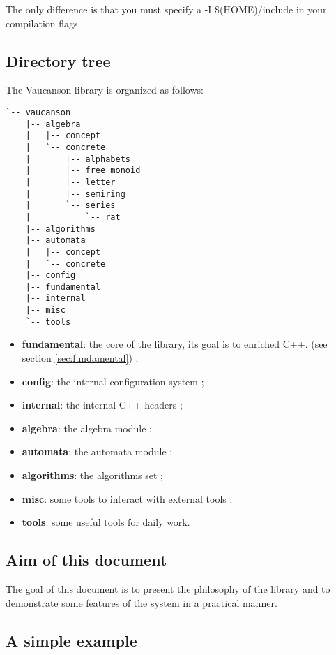 \documentclass{article}
\begin{document}
The only difference is that you must specify a -I \$(HOME)/include in
your compilation flags.

\subsection{Directory tree}

The Vaucanson library is organized as follows: 

\begin{verbatim}
`-- vaucanson
    |-- algebra
    |   |-- concept
    |   `-- concrete
    |       |-- alphabets
    |       |-- free_monoid
    |       |-- letter
    |       |-- semiring
    |       `-- series
    |           `-- rat
    |-- algorithms
    |-- automata
    |   |-- concept
    |   `-- concrete
    |-- config
    |-- fundamental
    |-- internal
    |-- misc
    `-- tools
\end{verbatim}

\begin{itemize}
\item \textbf{fundamental}: the core of the library, its goal is to
  enriched C++. (see section \ref{sec:fundamental}) ;

\item \textbf{config}: the internal configuration system ;
\item \textbf{internal}: the internal C++ headers ;
\item \textbf{algebra}: the algebra module ;
\item \textbf{automata}: the automata module ;
\item \textbf{algorithms}: the algorithms set ;
\item \textbf{misc}: some tools to interact with external tools ;
\item \textbf{tools}: some useful tools for daily work.
\end{itemize}

\subsection{Aim of this document}

The goal of this document is to present the philosophy of the library
and to demonstrate some features of the system in a practical manner.

\subsection{A simple example}
\end{document}
